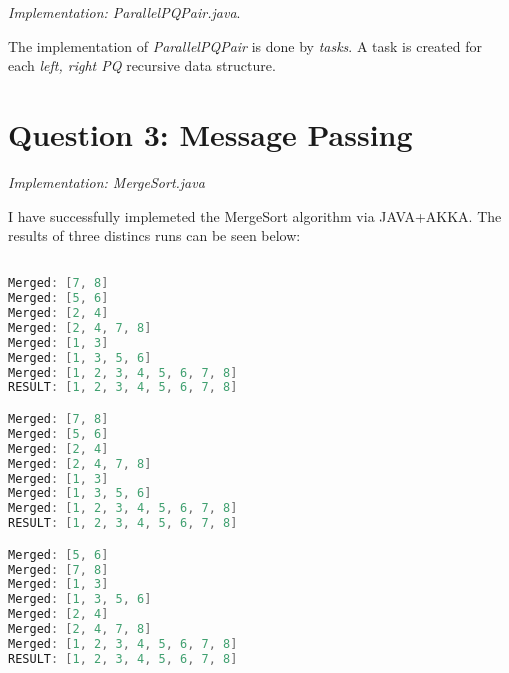 \documentclass[format=acmsmall, review=false, screen=true]{acmart}
\begin{document}
\textit{Implementation: ParallelPQPair.java}.

The implementation of \emph{ParallelPQPair} is done by \emph{tasks}. A task is created for each \textit{left, right PQ} recursive data structure.

\section{Question 3: Message Passing}

\textit{Implementation: MergeSort.java}

I have successfully implemeted the MergeSort algorithm via JAVA+AKKA. The results of three distincs runs can be seen below:

\begin{lstlisting}[language=java]

Merged: [7, 8]
Merged: [5, 6]
Merged: [2, 4]
Merged: [2, 4, 7, 8]
Merged: [1, 3]
Merged: [1, 3, 5, 6]
Merged: [1, 2, 3, 4, 5, 6, 7, 8]
RESULT: [1, 2, 3, 4, 5, 6, 7, 8]

Merged: [7, 8]
Merged: [5, 6]
Merged: [2, 4]
Merged: [2, 4, 7, 8]
Merged: [1, 3]
Merged: [1, 3, 5, 6]
Merged: [1, 2, 3, 4, 5, 6, 7, 8]
RESULT: [1, 2, 3, 4, 5, 6, 7, 8]

Merged: [5, 6]
Merged: [7, 8]
Merged: [1, 3]
Merged: [1, 3, 5, 6]
Merged: [2, 4]
Merged: [2, 4, 7, 8]
Merged: [1, 2, 3, 4, 5, 6, 7, 8]
RESULT: [1, 2, 3, 4, 5, 6, 7, 8]

\end{lstlisting}
\end{document}
